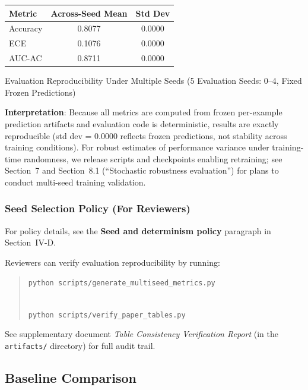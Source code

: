 \protect{}\label{tab:multiseed}
{\def\LTcaptype{none} %
\begin{longtable}[]{@{}lcc@{}}
\toprule\noalign{}
\textbf{Metric} & \textbf{Across-Seed Mean} & \textbf{Std Dev} \\
\midrule\noalign{}
\endhead
\bottomrule\noalign{}
\endlastfoot
Accuracy & 0.8077 & 0.0000 \\
ECE & 0.1076 & 0.0000 \\
AUC-AC & 0.8711 & 0.0000 \\
\end{longtable}
}

Evaluation Reproducibility Under Multiple Seeds (5 Evaluation Seeds: 0--4, Fixed Frozen Predictions)

\textbf{Interpretation}: Because all metrics are computed from frozen per-example prediction artifacts and evaluation code is deterministic, results are exactly reproducible (std dev = 0.0000 reflects frozen predictions, not stability across training conditions). For robust estimates of performance variance under training-time randomness, we release scripts and checkpoints enabling retraining; see Section~7 and Section~8.1 (``Stochastic robustness evaluation'') for plans to conduct multi-seed training validation.

\subsubsection{Seed Selection Policy (For Reviewers)}\label{seed-selection-policy-for-reviewers}

For policy details, see the \textbf{Seed and determinism policy} paragraph in Section~IV-D.

Reviewers can verify evaluation reproducibility by running:

\begin{quote}
\texttt{python\ scripts/generate\_multiseed\_metrics.py}\strut \\
\texttt{python\ scripts/verify\_paper\_tables.py}
\end{quote}

See supplementary document \emph{Table Consistency Verification Report} (in the \texttt{artifacts/} directory) for full audit trail.

\subsection{Baseline Comparison}\label{baseline-comparison}

